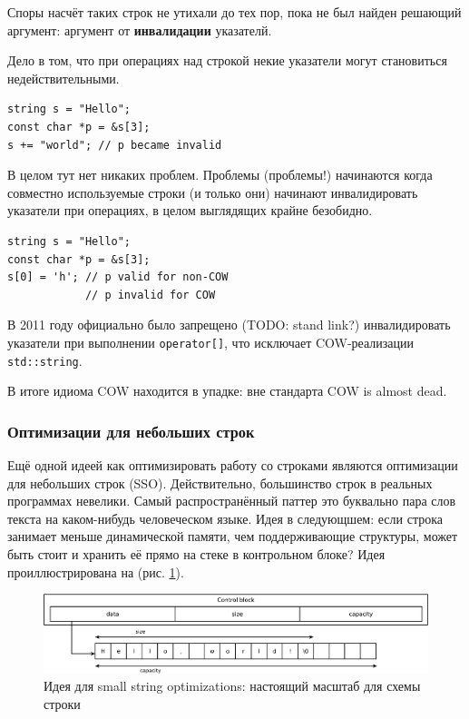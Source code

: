 \documentclass[a4paper,12pt,oneside]{article}
\begin{document}
Споры насчёт таких строк не утихали до тех пор, пока не был найден решающий аргумент: аргумент от \textbf{инвалидации} указателй. 

Дело в том, что при операциях над строкой некие указатели могут становиться недействительными.

\begin{lstlisting}
string s = "Hello";
const char *p = &s[3];
s += "world"; // p became invalid
\end{lstlisting}

В целом тут нет никаких проблем. Проблемы (проблемы!) начинаются когда совместно используемые строки (и только они) начинают инвалидировать указатели при операциях, в целом выглядящих крайне безобидно.

\begin{lstlisting}
string s = "Hello";
const char *p = &s[3];
s[0] = 'h'; // p valid for non-COW
            // p invalid for COW
\end{lstlisting}

В 2011 году официально было запрещено (TODO: stand link?) инвалидировать указатели при выполнении \lstinline!operator[]!, что исключает COW-реализации \lstinline!std::string!.

В итоге идиома COW находится в упадке: вне стандарта COW is almost dead.

\subsubsection{Оптимизации для небольших строк}\label{subsub:sso}

Ещё одной идеей как оптимизировать работу со строками являются оптимизации для небольших строк (SSO). Действительно, большинство строк в реальных программах невелики. Самый распространённый паттер это буквально пара слов текста на каком-нибудь человеческом языке. Идея в следующшем: если строка занимает меньше динамической памяти, чем поддерживающие структуры, может быть стоит и хранить её прямо на стеке в контрольном блоке? Идея проиллюстрирована на (рис. \ref{fig:string-sso-controlblock}).

\begin{figure}[ht]
\centering
\includegraphics[width=1.0\textwidth]{illustrations/string-sso-controlblock-crop.pdf}
\caption{Идея для small string optimizations: настоящий масштаб для схемы строки}
\label{fig:string-sso-controlblock}
\end{figure}
\end{document}
